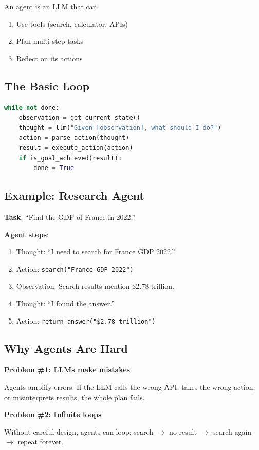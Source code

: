 \documentclass[11pt,oneside]{book}
\begin{document}
An agent is an LLM that can:
\begin{enumerate}
\item Use tools (search, calculator, APIs)
\item Plan multi-step tasks
\item Reflect on its actions
\end{enumerate}

\subsection{The Basic Loop}

\begin{lstlisting}[language=Python]
while not done:
    observation = get_current_state()
    thought = llm("Given [observation], what should I do?")
    action = parse_action(thought)
    result = execute_action(action)
    if is_goal_achieved(result):
        done = True
\end{lstlisting}

\subsection{Example: Research Agent}

\textbf{Task}: ``Find the GDP of France in 2022.''

\textbf{Agent steps}:
\begin{enumerate}
\item Thought: ``I need to search for France GDP 2022.''
\item Action: \texttt{search("France GDP 2022")}
\item Observation: Search results mention \$2.78 trillion.
\item Thought: ``I found the answer.''
\item Action: \texttt{return\_answer("\$2.78 trillion")}
\end{enumerate}

\subsection{Why Agents Are Hard}

\textbf{Problem \#1: LLMs make mistakes}

Agents amplify errors. If the LLM calls the wrong API, takes the wrong action, or misinterprets results, the whole plan fails.

\textbf{Problem \#2: Infinite loops}

Without careful design, agents can loop: search $\rightarrow$ no result $\rightarrow$ search again $\rightarrow$ repeat forever.
\end{document}
